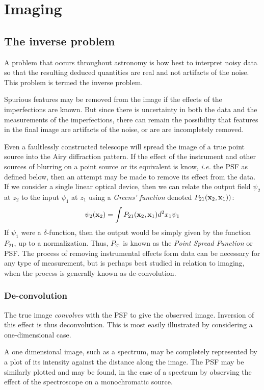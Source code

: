 \documentclass{article}
\begin{document}
\setcounter{section}{8}
\section{Imaging}

\subsection{The inverse problem}

A problem that occurs throughout astronomy is how best to interpret noisy data so that the resulting deduced quantities are real and not artifacts of the noise. This problem is termed the inverse problem. 

Spurious features may be removed from the image if the effects of the imperfections are known. But since there is uncertainty in both the data and the measurements of the imperfections, there can remain the possibility that features in the final image are artifacts of the noise, or are are incompletely removed.

Even a faultlessly constructed telescope will spread the image of a true point source into the Airy diffraction pattern. If the effect of the instrument and other sources of blurring on a point source or its equivalent is know, {\it i.e.} the PSF as defined below, then an attempt may be made to remove its effect from the data. If we consider a single linear optical device, then we can relate the output field $\psi_2$ at $z_2$ to the input $\psi_1$ at $z_1$ using a {\it Greens' function} denoted $P_{21}({\bf x}_2,{\bf x}_1))$: 
\[
\psi_2({\bf x}_2)=\int P_{21}({\bf x}_2,{\bf x}_1)d^2x_1\psi_1
\]
If $\psi_1$ were a $\delta$-function, then the output would be simply given by the function $P_{21}$, up to a normalization. Thus, $P_{21}$ is known as the {\it Point Spread Function} or PSF. The process of removing instrumental effects form data can be necessary for any type of measurement, but is perhaps best studied in relation to imaging, when the process is generally known as de-convolution.

\subsubsection{De-convolution}

The true image {\it convolves} with the PSF to give the observed image. Inversion of this effect is thus deconvolution. This is most easily illustrated by considering a one-dimensional case. 

A one dimensional image, such as a spectrum, may be completely represented by a plot of its intensity against the distance along the image. The PSF may be similarly plotted and may be found, in the case of a spectrum by observing the effect of the spectroscope on a monochromatic source. 
\end{document}
